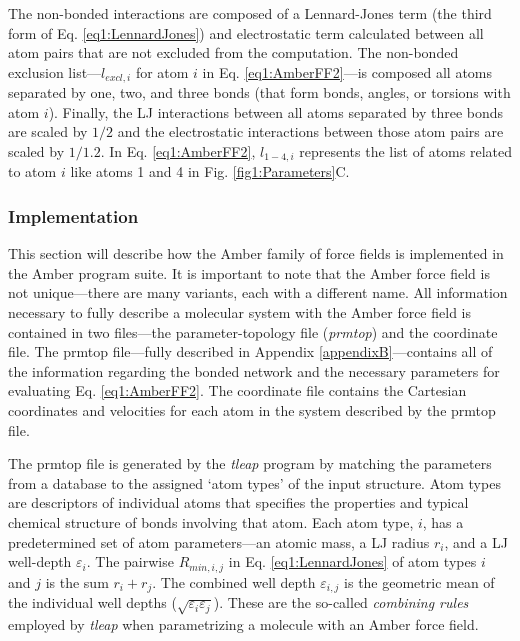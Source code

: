 The non-bonded interactions are composed of a Lennard-Jones term (the third form
of Eq. \ref{eq1:LennardJones}) and electrostatic term calculated between all
atom pairs that are not excluded from the computation. The non-bonded exclusion
list---$l_{excl,i}$ for atom $i$ in Eq. \ref{eq1:AmberFF2}---is composed all
atoms separated by one, two, and three bonds (\ie that form bonds, angles, or
torsions with atom $i$). Finally, the LJ interactions between all atoms
separated by three bonds are scaled by $1/2$ and the electrostatic interactions
between those atom pairs are scaled by $1/1.2$. In Eq. \ref{eq1:AmberFF2},
$l_{1-4,i}$ represents the list of atoms related to atom $i$ like atoms 1 and
4 in Fig. \ref{fig1:Parameters}C.

\subsubsection{Implementation}

This section will describe how the Amber family of force fields is implemented
in the Amber program suite. It is important to note that the Amber force field
is not unique---there are many variants, each with a different name.
\cite{Cornell_JAmChemSoc_1995_v117_p5179, Wang_JComputChem_2000_v21_p1049,
Duan03, Wang_JComputChem_2004_v25_p1157, Hornak_Proteins_2006_v65_p712,
Zgarbova_JChemTheoryComput_2011_v7_p2886} All information necessary to fully
describe a molecular system with the Amber force field is contained in two
files---the parameter-topology file (\emph{prmtop}) and the coordinate file. The
prmtop file---fully described in Appendix \ref{appendixB}---contains all of the
information regarding the bonded network and the necessary parameters for
evaluating Eq. \ref{eq1:AmberFF2}. The coordinate file contains the Cartesian
coordinates and velocities for each atom in the system described by the prmtop
file.

The prmtop file is generated by the \emph{tleap} program by matching the
parameters from a database to the assigned `atom types' of the input structure.
Atom types are descriptors of individual atoms that specifies the properties and
typical chemical structure of bonds involving that atom. Each atom type, $i$,
has a predetermined set of atom parameters---an atomic mass, a LJ radius $r_i$,
and a LJ well-depth $\varepsilon_i$. The pairwise $R_{min,i,j}$ in Eq.
\ref{eq1:LennardJones} of atom types $i$ and $j$ is the sum $r_i + r_j$. The
combined well depth $\varepsilon_{i,j}$ is the geometric mean of the individual
well depths ($\sqrt {\varepsilon_i \varepsilon_j}$). These are the so-called
\emph{combining rules} employed by \emph{tleap} when parametrizing a molecule
with an Amber force field.

